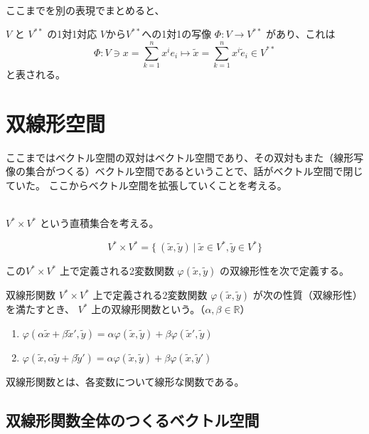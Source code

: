 \documentclass[uplatex,a4j,12pt,dvipdfmx]{jsarticle}
\begin{document}
\ \\

ここまでを別の表現でまとめると、

\begin{itembox}[l]{$V$ と $V^{**}$ の1対1対応}
	$V$から$V^{**}$への1対1の写像 $\Phi : V \to V^{**}$
	があり、これは
	$$
		\Phi: V \ni x = \sum_{k=1}^{n} x^{i} e_{i} \mapsto \tilde{x} = \sum_{k=1}^{n} x^{i} \tilde{e}_{i} \in V^{**}
	$$
	と表される。
\end{itembox}



\section{双線形空間}

ここまではベクトル空間の双対はベクトル空間であり、その双対もまた（線形写像の集合がつくる）ベクトル空間であるということで、話がベクトル空間で閉じていた。
ここからベクトル空間を拡張していくことを考える。

\ \\

$V^{*} \times V^{*}$ という直積集合を考える。

$$
	V^{*} \times V^{*}
	=
	\{
	\ (\tilde{x}, \tilde{y} ) \ | \ \tilde{x} \in V^{*}, \tilde{y} \in V^{*}
	\}
$$

この$V^{*} \times V^{*}$ 上で定義される2変数関数
$\varphi(\tilde{x},\tilde{y})$ の双線形性を次で定義する。


\begin{itembox}[l]{双線形関数}
	$V^{*} \times V^{*}$ 上で定義される2変数関数
	$\varphi(\tilde{x},\tilde{y})$
	が次の性質（双線形性）を満たすとき、
	$V^{*}$ 上の双線形関数という。（$\alpha, \beta \in \mathbb{R}$）
	\begin{enumerate}
		\item $\varphi(\alpha \tilde{x} + \beta \tilde{x}', \tilde{y}) = \alpha \varphi( \tilde{x}, \tilde{y}) + \beta \varphi( \tilde{x}', \tilde{y})$
		\item $\varphi(\tilde{x}, \alpha \tilde{y} + \beta \tilde{y}') = \alpha \varphi( \tilde{x}, \tilde{y}) + \beta \varphi( \tilde{x}, \tilde{y}')$
	\end{enumerate}
\end{itembox}

双線形関数とは、各変数について線形な関数である。

\subsection{双線形関数全体のつくるベクトル空間}
\end{document}
